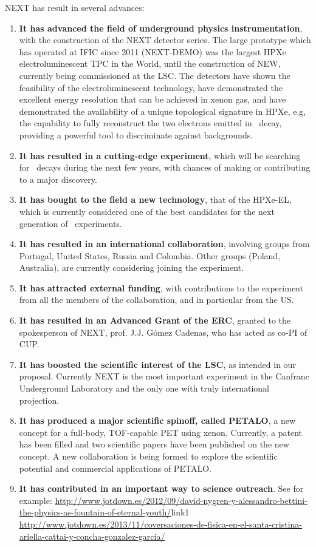 NEXT has result in several advances:
\begin{enumerate}
\item {\bf It has advanced the field of underground physics instrumentation}, with the construction of the NEXT detector series. The large prototype which has operated at IFIC since 2011 (NEXT-DEMO) was the largest HPXe electroluminescent TPC in the World, until the construction of NEW, currently being commissioned at the LSC. The detectors have shown the feasibility of the electroluminescent technology, have demonstrated the excellent energy resolution that can be achieved in xenon gas, and have demonstrated  the availability of a unique topological signature in HPXe, e.g, the capability to fully reconstruct the two electrons emitted in \bb\ decay, providing a powerful tool to discriminate against backgrounds. 
\item {\bf It has resulted in a cutting-edge experiment}, which will be searching for \bbonu\ decays during the next few years, with chances of making or contributing to a major discovery. 
\item {\bf It has bought to the field a new technology}, that of the HPXe-EL, which is currently considered one of the best candidates for the next generation of \bbonu\ experiments.
 \item {\bf It has resulted in an international collaboration}, involving groups from Portugal, United States, Russia and Colombia. Other groups (Poland, Australia), are currently considering joining the experiment.
 \item {\bf It has attracted external funding}, with contributions to the experiment from all the members of the collaboration, and in particular from the US.
  \item {\bf It has resulted in an Advanced Grant of the ERC}, granted to the spokesperson of NEXT, prof. J.J. G\'omez Cadenas, who has acted as co-PI of CUP. 
   \item {\bf It has boosted the scientific interest of the LSC}, as intended in our proposal. Currently NEXT is the most important experiment in the Canfranc Underground Laboratory and the only one with truly international projection. 
  \item {\bf It has produced a major scientific spinoff, called PETALO}, a new concept for a full-body, TOF-capable PET using xenon. Currently, a patent has been filled and two scientific papers have been published on the new concept. A new collaboration is being formed to explore the scientific potential and commercial applications of PETALO. 
   \item {\bf It has contributed in an important way to science outreach}. See for example:
   \url{http://www.jotdown.es/2012/09/david-nygren-y-alessandro-bettini-the-physics-as-fountain-of-eternal-youth/}{link1}
   \url{http://www.jotdown.es/2013/11/coversaciones-de-fisica-en-el-santa-cristina-ariella-cattai-y-concha-gonzalez-garcia/}
\end{enumerate}
